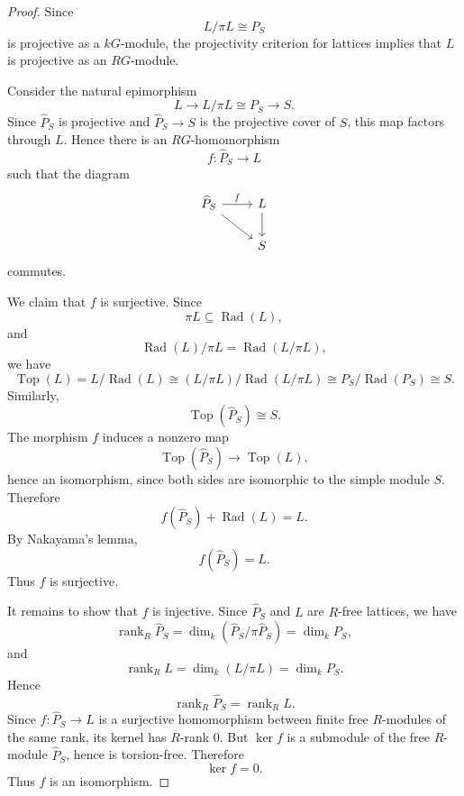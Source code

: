 \begin{proof}
    Since
    \[
        L/\pi L\cong P_S
    \]
    is projective as a \(kG\)-module, the projectivity criterion for lattices implies
    that \(L\) is projective as an \(RG\)-module.

    Consider the natural epimorphism
    \[
        L\longrightarrow L/\pi L\cong P_S\longrightarrow S.
    \]
    Since \(\widehat P_S\) is projective and
    \(\widehat P_S\longrightarrow S\) is the projective cover of \(S\), this map
    factors through \(L\). Hence there is an \(RG\)-homomorphism
    \[
        f:\widehat P_S\longrightarrow L
    \]
    such that the diagram
    \[
    \begin{tikzcd}
        \widehat P_S \arrow[dr] \arrow[r,"f"] & L \arrow[d] \\
        & S
    \end{tikzcd}
    \]
    commutes.

    We claim that \(f\) is surjective. Since
    \[
        \pi L\subseteq \operatorname{Rad}(L),
    \]
    and
    \[
        \operatorname{Rad}(L)/\pi L
        =
        \operatorname{Rad}(L/\pi L),
    \]
    we have
    \[
        \operatorname{Top}(L)
        =
        L/\operatorname{Rad}(L)
        \cong
        (L/\pi L)/\operatorname{Rad}(L/\pi L)
        \cong
        P_S/\operatorname{Rad}(P_S)
        \cong
        S.
    \]
    Similarly,
    \[
        \operatorname{Top}(\widehat P_S)\cong S.
    \]
    The morphism \(f\) induces a nonzero map
    \[
        \operatorname{Top}(\widehat P_S)\longrightarrow \operatorname{Top}(L),
    \]
    hence an isomorphism, since both sides are isomorphic to the simple module \(S\).
    Therefore
    \[
        f(\widehat P_S)+\operatorname{Rad}(L)=L.
    \]
    By Nakayama's lemma,
    \[
        f(\widehat P_S)=L.
    \]
    Thus \(f\) is surjective.

    It remains to show that \(f\) is injective. Since \(\widehat P_S\) and \(L\) are
    \(R\)-free lattices, we have
    \[
        \operatorname{rank}_R\widehat P_S
        =
        \dim_k(\widehat P_S/\pi\widehat P_S)
        =
        \dim_k P_S,
    \]
    and
    \[
        \operatorname{rank}_R L
        =
        \dim_k(L/\pi L)
        =
        \dim_k P_S.
    \]
    Hence
    \[
        \operatorname{rank}_R\widehat P_S=\operatorname{rank}_R L.
    \]
    Since \(f:\widehat P_S\to L\) is a surjective homomorphism between finite free
    \(R\)-modules of the same rank, its kernel has \(R\)-rank \(0\). But
    \(\ker f\) is a submodule of the free \(R\)-module \(\widehat P_S\), hence is
    torsion-free. Therefore
    \[
        \ker f=0.
    \]
    Thus \(f\) is an isomorphism.
\end{proof}

